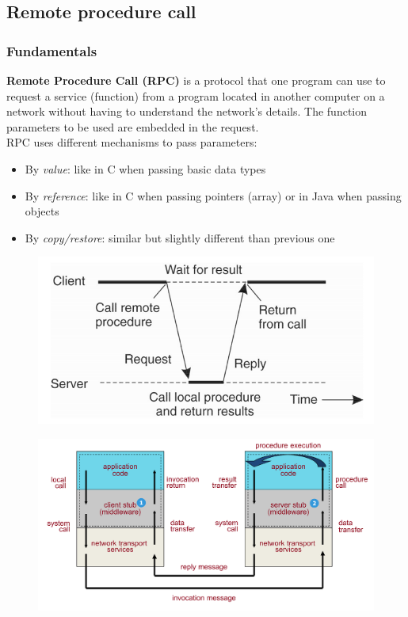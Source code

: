 \documentclass[10pt,a4paper]{article}
\begin{document}
\subsection{Remote procedure call}
\subsubsection{Fundamentals}
\textbf{Remote Procedure Call (RPC)} is a protocol that one program can use to request a service (function) from a program located in another computer on a network without having to understand the network's details. The function parameters to be used are embedded in the request. \\
RPC uses different mechanisms to pass parameters:
\begin{itemize}
	\item By \textit{value}: like in C when passing basic data types
	\item By \textit{reference}: like in  C when passing pointers (array) or in Java when passing objects
	\item By \textit{copy/restore}: similar but slightly different than previous one
\end{itemize}
\begin{figure}[h!]
\centering
\begin{minipage}{.5\textwidth}
  \centering
  \includegraphics[width=.9\linewidth]{images/rpc.png}
  \label{fig:rpc}
\end{minipage}%
\begin{minipage}{.5\textwidth}
  \centering
  \includegraphics[width=.9\linewidth]{images/rpc2.png}
  \label{fig:rpc2}
\end{minipage}
\end{figure} 
\end{document}
